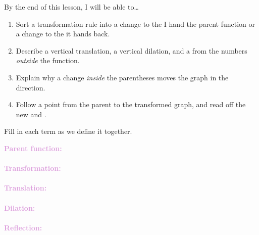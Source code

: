 \documentclass[10pt]{article}
\begin{document}

\vspace{0.12in}

\begin{objectivebox}
By the end of this lesson, I will be able to\ldots
\begin{enumerate}[itemsep=2pt]
  \item Sort a transformation rule into a change to the  I hand
        the parent function or a change to the  it hands back.
  \item Describe a vertical translation, a vertical dilation, and a
         from the numbers \textit{outside} the function.
  \item Explain why a change \textit{inside} the parentheses moves the graph
        in the  direction.
  \item Follow a  point from the parent to the transformed graph,
        and read off the new  and .
\end{enumerate}
\end{objectivebox}

\vspace{0.1in}

\boxguard
\begin{vocabbox}
Fill in each term as we define it together.
\par\vspace{2pt}
\noindent\textbf{\textcolor{plum}{Parent function:}}\\[1pt]
\\[3pt]
\noindent\textbf{\textcolor{plum}{Transformation:}}\\[1pt]
\\[3pt]
\noindent\textbf{\textcolor{plum}{Translation:}}\\[1pt]
\\[3pt]
\noindent\textbf{\textcolor{plum}{Dilation:}}\\[1pt]
\\[3pt]
\noindent\textbf{\textcolor{plum}{Reflection:}}\\[1pt]
\end{vocabbox}
\end{document}
